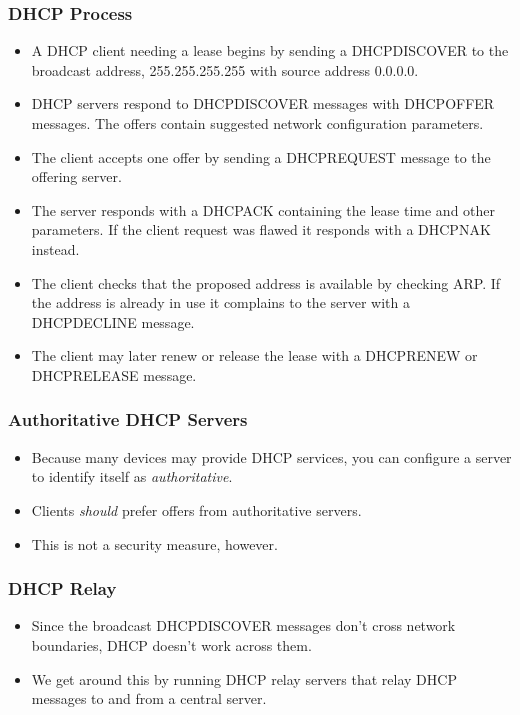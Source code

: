 \documentclass[10pt]{beamer}
\begin{document}
\begin{frame}
  \frametitle{DHCP Process}
  \begin{itemize}
    \item A DHCP client needing a lease begins by sending a DHCPDISCOVER to 
          the broadcast address, 255.255.255.255 with source address 0.0.0.0.
    \item DHCP servers respond to DHCPDISCOVER messages with DHCPOFFER messages. The offers contain suggested network configuration parameters.
    \item The client accepts one offer by sending a DHCPREQUEST message to 
          the offering server.
    \item The server responds with a DHCPACK containing the lease time and other parameters.  If the client request was flawed it responds with a DHCPNAK instead.
    \item The client checks that the proposed address is available by checking ARP.  If the address is already in use it complains to the server with a DHCPDECLINE message.
    \item The client may later renew or release the lease with a DHCPRENEW or DHCPRELEASE message.
  \end{itemize}  
\end{frame}

\begin{frame}
  \frametitle{Authoritative DHCP Servers}
  \begin{itemize}
    \item Because many devices may provide DHCP services, you can configure a
          server to identify itself as \emph{authoritative}.
    \item Clients \emph{should} prefer offers from authoritative servers.
    \item This is not a security measure, however.
  \end{itemize}  
\end{frame}


\begin{frame}
  \frametitle{DHCP Relay}
  \begin{itemize}
    \item Since the broadcast DHCPDISCOVER messages don't cross network
          boundaries, DHCP doesn't work across them.
    \item We get around this by running DHCP relay servers that relay
          DHCP messages to and from a central server.
  \end{itemize}  
\end{frame}
\end{document}
